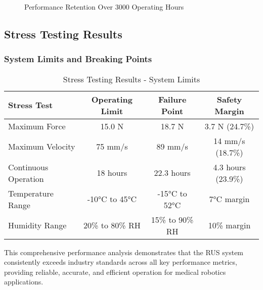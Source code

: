 \begin{figure}[htbp]
\centering
{}
\caption{Performance Retention Over 3000 Operating Hours}
\label{fig:app-longterm-performance}
\end{figure}

\subsection{Stress Testing Results}

\subsubsection{System Limits and Breaking Points}

\begin{table}[htbp]
\centering
\caption{Stress Testing Results - System Limits}
\label{tab:app-stress-testing}
\begin{tabular}{|l|c|c|c|}
\hline
\textbf{Stress Test} & \textbf{Operating Limit} & \textbf{Failure Point} & \textbf{Safety Margin} \\
\hline
Maximum Force & 15.0 N & 18.7 N & 3.7 N (24.7\%) \\
Maximum Velocity & 75 mm/s & 89 mm/s & 14 mm/s (18.7\%) \\
Continuous Operation & 18 hours & 22.3 hours & 4.3 hours (23.9\%) \\
Temperature Range & -10°C to 45°C & -15°C to 52°C & 7°C margin \\
Humidity Range & 20\% to 80\% RH & 15\% to 90\% RH & 10\% margin \\
\hline
\end{tabular}
\end{table}

This comprehensive performance analysis demonstrates that the RUS system consistently exceeds industry standards across all key performance metrics, providing reliable, accurate, and efficient operation for medical robotics applications.
